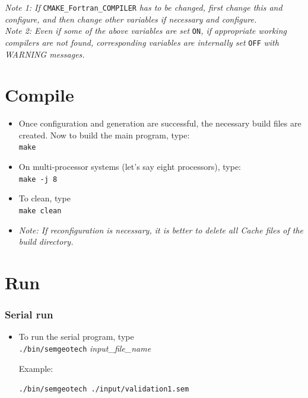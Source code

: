 {\emph{Note 1: If}} \texttt{CMAKE\_Fortran\_COMPILER} {\emph{has to be changed, first change this and configure, and then change other variables if necessary and configure.}}\\
{\emph{Note 2: Even if some of the above variables are set }} \texttt{ON}{\emph{, if appropriate working compilers are not found, corresponding variables are internally set}} \texttt{OFF} {\emph{with WARNING messages.}}

\section{Compile}
\begin{itemize}[]
  \item Once configuration and generation are successful, the necessary build files are created. Now to build the main program, type: \\
  \texttt{make}

  \item On multi-processor systems (let's say eight processors), type:\\
  \texttt{make -j 8}

  \item To clean, type\\
  \texttt{make clean}
  \item{\emph{Note: If reconfiguration is necessary, it is better to delete all Cache files of the build directory.}}
\end{itemize}

\section{Run}
\subsubsection{Serial run}
\begin{itemize}[-]
\item To run the serial program, type \\
    \texttt{./bin/semgeotech} \emph{input\_file\_name}

    Example:

    \texttt{./bin/semgeotech ./input/validation1.sem}

\end{itemize}

